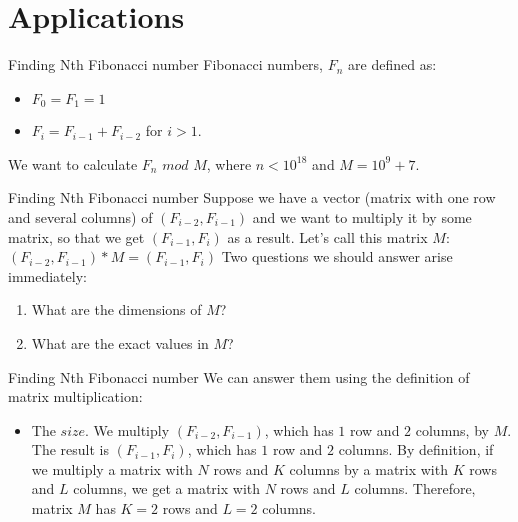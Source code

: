 \documentclass{beamer}
\begin{document}
\section{Applications}

\begin{frame}{Finding Nth Fibonacci number}
  Fibonacci numbers, $F_n$ are defined as:
  \begin{itemize}
    \item $F_0 = F_1 = 1$
    \item $F_i = F_{i-1} + F_{i-2}$ for $i > 1$.
  \end{itemize}
  We want to calculate $F_n$ $mod$ $M$, where $n < 10^{18}$ and $M = 10^9 + 7$.
\end{frame}

\begin{frame}{Finding Nth Fibonacci number}
  Suppose we have a vector (matrix with 
  one row and several columns) of $(F_{i-2}, F_{i-1})$
  and we want to multiply it by some matrix, so that we get $(F_{i-1}, F_i)$ as a result.
  \newline
  Let's call this matrix $M$: \newline
  $(F_{i-2}, F_{i-1}) * M = (F_{i-1}, F_i)$ \newline \newline
  Two questions we should answer arise immediately:
  \begin{enumerate}
    \item What are the dimensions of $M$?
    \item What are the exact values in $M$?
  \end{enumerate}
\end{frame}

\begin{frame}{Finding Nth Fibonacci number}
  We can answer them using the definition of matrix multiplication: \newline
  \begin{itemize}
    \item The $size$. \newline
      We multiply $(F_{i-2}, F_{i-1})$, which has $1$ row and $2$ columns, by $M$. 
      \newline
      The result is $(F_{i-1}, F_i)$, which has $1$ row and $2$ columns.
      \newline \newline
      By definition, if we multiply a matrix with $N$ rows and $K$ columns by 
      a matrix with $K$ rows and $L$ columns, we get a matrix with $N$ rows and $L$ columns.
      \newline \newline
      Therefore, matrix $M$ has $K = 2$ rows and $L = 2$ columns.
  \end{itemize}
\end{frame}
\end{document}
